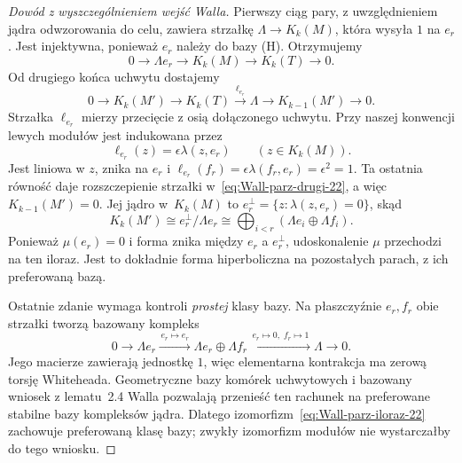 \begin{proof}[Dowód z wyszczególnieniem wejść Walla]
Pierwszy ciąg pary, z uwzględnieniem jądra odwzorowania
do celu, zawiera strzałkę $\Lambda\to K_k(M)$,
która wysyła $1$ na $e_r$. Jest injektywna,
ponieważ $e_r$ należy do bazy (H). Otrzymujemy
\begin{equation}\label{eq:Wall-parz-pierwszy-22}
 0\longrightarrow\Lambda e_r\longrightarrow K_k(M)
  \longrightarrow K_k(T)\longrightarrow0.
\end{equation}
Od drugiego końca uchwytu dostajemy
\begin{equation}\label{eq:Wall-parz-drugi-22}
 0\longrightarrow K_k(M')\longrightarrow K_k(T)
  \xrightarrow{\,\ell_{e_r}\,}\Lambda
  \longrightarrow K_{k-1}(M')\longrightarrow0.
\end{equation}
Strzałka $\ell_{e_r}$ mierzy przecięcie z osią
dołączonego uchwytu. Przy naszej konwencji lewych
modułów jest indukowana przez
\[
 \ell_{e_r}(z)=\epsilon\lambda(z,e_r)
 \qquad(z\in K_k(M)).
\]
Jest liniowa w $z$, znika na $e_r$ i
$\ell_{e_r}(f_r)=
\epsilon\lambda(f_r,e_r)=\epsilon^2=1$.
Ta ostatnia równość daje rozszczepienie strzałki
w~\eqref{eq:Wall-parz-drugi-22}, a więc
$K_{k-1}(M')=0$. Jej jądro w~$K_k(M)$ to
$e_r^\perp=\{z:\lambda(z,e_r)=0\}$, skąd
\begin{equation}\label{eq:Wall-parz-iloraz-22}
 K_k(M')\cong e_r^\perp/\Lambda e_r
   \cong\bigoplus_{i<r}(\Lambda e_i\oplus\Lambda f_i).
\end{equation}
Ponieważ $\mu(e_r)=0$ i forma znika między
$e_r$ a $e_r^\perp$, udoskonalenie $\mu$
przechodzi na ten iloraz. Jest to dokładnie forma
hiperboliczna na pozostałych parach, z ich
preferowaną bazą.

Ostatnie zdanie wymaga kontroli \emph{prostej}
klasy bazy. Na płaszczyźnie $e_r,f_r$ obie
strzałki tworzą bazowany kompleks
\[
 0\longrightarrow\Lambda e_r
 \xrightarrow{\,e_r\mapsto e_r\,}
 \Lambda e_r\oplus\Lambda f_r
 \xrightarrow{\,e_r\mapsto0,\;f_r\mapsto1\,}
 \Lambda\longrightarrow0.
\]
Jego macierze zawierają jednostkę $1$, więc
elementarna kontrakcja ma zerową torsję
Whiteheada. Geometryczne bazy komórek uchwytowych
i bazowany wniosek z lematu~2.4 Walla pozwalają
przenieść ten rachunek na preferowane stabilne
bazy kompleksów jądra.
Dlatego izomorfizm~\eqref{eq:Wall-parz-iloraz-22}
zachowuje preferowaną klasę bazy; zwykły
izomorfizm modułów nie wystarczałby do tego wniosku.


\end{proof}

